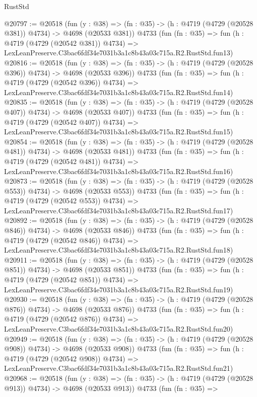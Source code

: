\begin{lexlean}{RustStd}
\begin{coremodule}
@20797 := @20518
    (fun (y : @38) => (fn : @35) -> (h : @4719 (@4729 (@20528 @381)) @4734) -> @4698 (@20533 @381))
    @4733
    (fun (fn : @35) =>
    fun (h : @4719 (@4729 (@20542 @381)) @4734) =>
    LexLeanPreserve.C3bac6fdf34e7031b3a1c8b43a03c715a.R2.RustStd.fun13)
@20816 := @20518
    (fun (y : @38) => (fn : @35) -> (h : @4719 (@4729 (@20528 @396)) @4734) -> @4698 (@20533 @396))
    @4733
    (fun (fn : @35) =>
    fun (h : @4719 (@4729 (@20542 @396)) @4734) =>
    LexLeanPreserve.C3bac6fdf34e7031b3a1c8b43a03c715a.R2.RustStd.fun14)
@20835 := @20518
    (fun (y : @38) => (fn : @35) -> (h : @4719 (@4729 (@20528 @407)) @4734) -> @4698 (@20533 @407))
    @4733
    (fun (fn : @35) =>
    fun (h : @4719 (@4729 (@20542 @407)) @4734) =>
    LexLeanPreserve.C3bac6fdf34e7031b3a1c8b43a03c715a.R2.RustStd.fun15)
@20854 := @20518
    (fun (y : @38) => (fn : @35) -> (h : @4719 (@4729 (@20528 @481)) @4734) -> @4698 (@20533 @481))
    @4733
    (fun (fn : @35) =>
    fun (h : @4719 (@4729 (@20542 @481)) @4734) =>
    LexLeanPreserve.C3bac6fdf34e7031b3a1c8b43a03c715a.R2.RustStd.fun16)
@20873 := @20518
    (fun (y : @38) => (fn : @35) -> (h : @4719 (@4729 (@20528 @553)) @4734) -> @4698 (@20533 @553))
    @4733
    (fun (fn : @35) =>
    fun (h : @4719 (@4729 (@20542 @553)) @4734) =>
    LexLeanPreserve.C3bac6fdf34e7031b3a1c8b43a03c715a.R2.RustStd.fun17)
@20892 := @20518
    (fun (y : @38) => (fn : @35) -> (h : @4719 (@4729 (@20528 @846)) @4734) -> @4698 (@20533 @846))
    @4733
    (fun (fn : @35) =>
    fun (h : @4719 (@4729 (@20542 @846)) @4734) =>
    LexLeanPreserve.C3bac6fdf34e7031b3a1c8b43a03c715a.R2.RustStd.fun18)
@20911 := @20518
    (fun (y : @38) => (fn : @35) -> (h : @4719 (@4729 (@20528 @851)) @4734) -> @4698 (@20533 @851))
    @4733
    (fun (fn : @35) =>
    fun (h : @4719 (@4729 (@20542 @851)) @4734) =>
    LexLeanPreserve.C3bac6fdf34e7031b3a1c8b43a03c715a.R2.RustStd.fun19)
@20930 := @20518
    (fun (y : @38) => (fn : @35) -> (h : @4719 (@4729 (@20528 @876)) @4734) -> @4698 (@20533 @876))
    @4733
    (fun (fn : @35) =>
    fun (h : @4719 (@4729 (@20542 @876)) @4734) =>
    LexLeanPreserve.C3bac6fdf34e7031b3a1c8b43a03c715a.R2.RustStd.fun20)
@20949 := @20518
    (fun (y : @38) => (fn : @35) -> (h : @4719 (@4729 (@20528 @908)) @4734) -> @4698 (@20533 @908))
    @4733
    (fun (fn : @35) =>
    fun (h : @4719 (@4729 (@20542 @908)) @4734) =>
    LexLeanPreserve.C3bac6fdf34e7031b3a1c8b43a03c715a.R2.RustStd.fun21)
@20968 := @20518
    (fun (y : @38) => (fn : @35) -> (h : @4719 (@4729 (@20528 @913)) @4734) -> @4698 (@20533 @913))
    @4733
    (fun (fn : @35) =>

\end{coremodule}
\end{lexlean}
